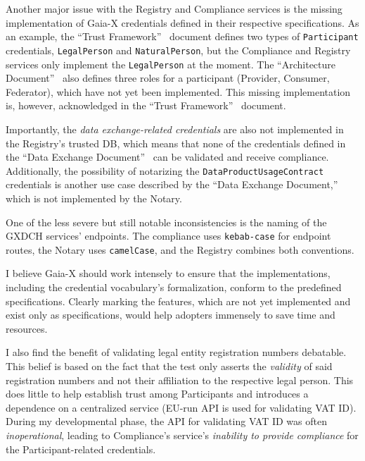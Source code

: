 Another major issue with the Registry and Compliance services is the missing implementation of Gaia-X credentials defined in their respective specifications.
As an example, the ``Trust Framework''~\cite{gaiax_trust_framework} document defines two types of \texttt{Participant} credentials, \texttt{LegalPerson} and \texttt{NaturalPerson}, but the Compliance and Registry services only implement the \texttt{LegalPerson} at the moment.
The ``Architecture Document''~\cite{gaiax_architecture_document} also defines three roles for a participant (Provider, Consumer, Federator), which have not yet been implemented.
This missing implementation is, however, acknowledged in the ``Trust Framework''~\cite{gaiax_trust_framework} document.

Importantly, the \textit{data exchange-related credentials} are also not implemented in the Registry's trusted DB, which means that none of the credentials defined in the ``Data Exchange Document''~\cite{gaiax_data_exchange_document} can be validated and receive compliance.
Additionally, the possibility of notarizing the \texttt{DataProductUsageContract} credentials is another use case described by the ``Data Exchange Document,''~\cite{gaiax_data_exchange_document} which is not implemented by the Notary.

One of the less severe but still notable inconsistencies is the naming of the GXDCH services' endpoints.
The compliance uses \texttt{kebab-case} for endpoint routes, the Notary uses \texttt{camelCase}, and the Registry combines both conventions.

I believe Gaia-X should work intensely to ensure that the implementations, including the credential vocabulary's formalization, conform to the predefined specifications.
Clearly marking the features, which are not yet implemented and exist only as specifications, would help adopters immensely to save time and resources.

I also find the benefit of validating legal entity registration numbers debatable.
This belief is based on the fact that the test only asserts the \textit{validity} of said registration numbers and not their affiliation to the respective legal person.
This does little to help establish trust among Participants and introduces a dependence on a centralized service (EU-run API is used for validating VAT ID). During my developmental phase, the API for validating VAT ID was often \textit{inoperational}, leading to Compliance's service's \textit{inability to provide compliance} for the Participant-related credentials.

